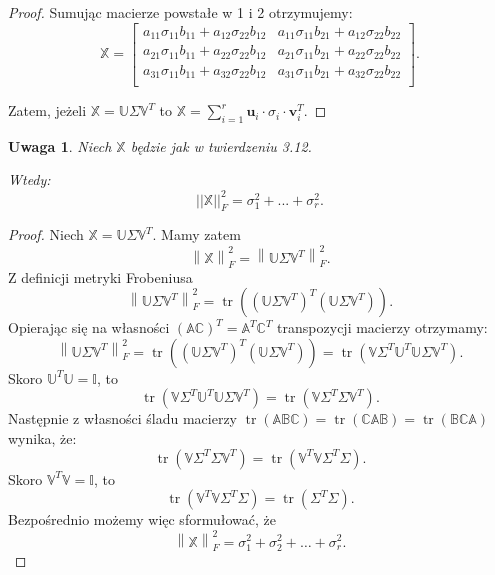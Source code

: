 \documentclass[12pt,a4paper]{report}
\newtheorem{uwaga}[df]{Uwaga}
\newcommand{\norma}[1]{\left\| {#1} \right\|}
\newcommand{\tr}[1]{\operatorname{tr}\left({#1} \right)}
\begin{document}
\begin{proof}
Sumując macierze powstałe w 1 i 2 otrzymujemy:
$$ \mathbb{X} = \left[
        \begin{array}{cc}
a_{11} \sigma_{11} b_{11} + a_{12} \sigma_{22} b_{12}  & a_{11} \sigma_{11} b_{21} + a_{12} \sigma_{22} b_{22}\\
a_{21} \sigma_{11} b_{11} + a_{22} \sigma_{22} b_{12}  & a_{21} \sigma_{11} b_{21} + a_{22} \sigma_{22} b_{22}\\
a_{31} \sigma_{11} b_{11} + a_{32} \sigma_{22} b_{12}  & a_{31} \sigma_{11} b_{21} + a_{32} \sigma_{22} b_{22}\\
         \end{array}
      \right].$$

Zatem, jeżeli $\mathbb{X}=\mathbb{U} \Sigma \mathbb{V}^T$ to $\mathbb{X} = \sum_{i=1}^r \mathbf{u}_i \cdot\sigma_i \cdot \mathbf{v}_i^T$.
\end{proof}


\begin{uwaga}
Niech $\mathbb{X}$ będzie jak w twierdzeniu 3.12.

Wtedy:
$$
||\mathbb{X}||_F^2 = \sigma_{1}^2+...+\sigma_{r}^2.
$$
\end{uwaga}

\begin{proof}
Niech $\mathbb{X}=\mathbb{U} \Sigma \mathbb{V}^T$.
Mamy zatem 
$$
\norma{ \mathbb{X}}_F^2 =
\norma{\mathbb{U} \Sigma \mathbb{V}^T}_F^2.
$$
Z definicji metryki Frobeniusa
$$
\norma{\mathbb{U} \Sigma \mathbb{V}^T}_F^2 = \tr{(\mathbb{U} \Sigma \mathbb{V}^T)^T (\mathbb{U} \Sigma \mathbb{V}^T)}.
$$
Opierając się na własności $(\mathbb{A}\mathbb{C})^T = \mathbb{A}^T \mathbb{C}^T$ transpozycji macierzy otrzymamy:
$$
\norma{\mathbb{U} \Sigma \mathbb{V}^T}_F^2 = \tr{(\mathbb{U} \Sigma \mathbb{V}^T)^T (\mathbb{U} \Sigma \mathbb{V}^T)} = \tr{\mathbb{V} \Sigma^T \mathbb{U}^T \mathbb{U} \Sigma \mathbb{V}^T}.
$$
Skoro $\mathbb{U}^T \mathbb{U} = \mathbb{I}$, to
$$
\tr{\mathbb{V} \Sigma^T \mathbb{U}^T \mathbb{U} \Sigma \mathbb{V}^T} = \tr{\mathbb{V} \Sigma ^T \Sigma \mathbb{V}^T}.
$$
Następnie z własności śladu macierzy $\tr{\mathbb{A} \mathbb{B} \mathbb{C}}  = \tr{\mathbb{C} \mathbb{A} \mathbb{B}} = \tr{\mathbb{B} \mathbb{C} \mathbb{A}}$ wynika, że:
$$
\tr{\mathbb{V} \Sigma ^T \Sigma \mathbb{V}^T} = \tr{\mathbb{V}^T \mathbb{V} \Sigma^T \Sigma}.
$$
Skoro $\mathbb{V}^T \mathbb{V} = \mathbb{I}$, to
$$
\tr{\mathbb{V}^T \mathbb{V} \Sigma^T \Sigma} = \tr{\Sigma^T \Sigma}.
$$
Bezpośrednio możemy więc sformułować, że
$$
\norma{ \mathbb{X}}_F^2 = \sigma_{1}^2 + \sigma_{2}^2 + \ldots + \sigma_{r}^2.
$$
\end{proof}
\end{document}
